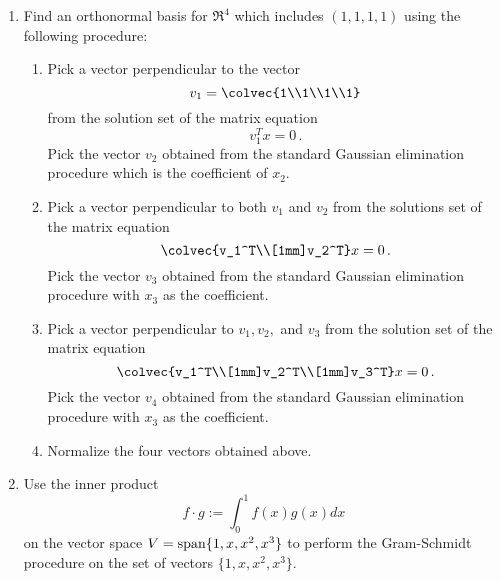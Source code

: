 \begin{enumerate}




\item Find an orthonormal  basis for $\Re^4$ which includes $(1,1,1,1)$ using the following procedure:\\
\begin{enumerate} 
\item Pick a vector perpendicular to the vector 
$$v_1 =\colvec{1\\1\\1\\1}$$ from the solution set of the matrix equation $$v_1^Tx=0\, .$$ Pick the vector $v_2$ obtained from the standard Gaussian elimination procedure which is the coefficient of $x_2$.
\item Pick a vector perpendicular to both $v_1$ and $v_2$ from the solutions set of the matrix equation $$\colvec{v_1^T\\[1mm]v_2^T}x=0\, .$$ Pick the vector $v_3$ obtained from the standard Gaussian elimination procedure with $x_3$ as the coefficient. 
\item Pick a vector perpendicular to $v_1,v_2,$ and $v_3$ from the solution set of the matrix equation $$\colvec{v_1^T\\[1mm]v_2^T\\[1mm]v_3^T}x=0\, .$$  Pick the vector $v_4$ obtained from the standard Gaussian elimination procedure with $x_3$ as the coefficient. 
\item Normalize the four vectors obtained   above.
\end{enumerate}


\item Use the inner product $$f\cdot g := \int_0^1 f(x)g(x)dx$$  on the vector space $V={\rm span} \{1,x,x^2,x^3\}$ to perform the Gram-Schmidt procedure on the set of vectors $\{1,x,x^2,x^3\}$. 


\end{enumerate}
